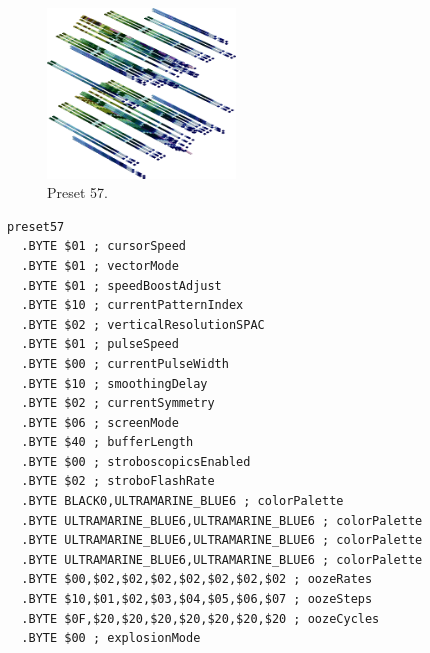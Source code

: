 \clearpage
\begin{minipage}[b]{0.48\linewidth}
\begin{figure}[H]                                                          
  \centering                                                             
  \begin{adjustbox}{width=5cm,center}                                   
  \includegraphics[width=5cm]{src/colorspace_presets/preset57-45.png}%
  \end{adjustbox}                                                        
\caption*{Preset 57.}                                           
\end{figure}                                                               
\end{minipage}
\hspace{0.1cm}
\begin{minipage}[b]{0.48\linewidth}                            
\begin{lstlisting}[basicstyle=\ttfamily\tiny]
preset57
  .BYTE $01 ; cursorSpeed
  .BYTE $01 ; vectorMode
  .BYTE $01 ; speedBoostAdjust
  .BYTE $10 ; currentPatternIndex
  .BYTE $02 ; verticalResolutionSPAC
  .BYTE $01 ; pulseSpeed
  .BYTE $00 ; currentPulseWidth
  .BYTE $10 ; smoothingDelay
  .BYTE $02 ; currentSymmetry
  .BYTE $06 ; screenMode
  .BYTE $40 ; bufferLength
  .BYTE $00 ; stroboscopicsEnabled
  .BYTE $02 ; stroboFlashRate
  .BYTE BLACK0,ULTRAMARINE_BLUE6 ; colorPalette
  .BYTE ULTRAMARINE_BLUE6,ULTRAMARINE_BLUE6 ; colorPalette
  .BYTE ULTRAMARINE_BLUE6,ULTRAMARINE_BLUE6 ; colorPalette
  .BYTE ULTRAMARINE_BLUE6,ULTRAMARINE_BLUE6 ; colorPalette
  .BYTE $00,$02,$02,$02,$02,$02,$02,$02 ; oozeRates
  .BYTE $10,$01,$02,$03,$04,$05,$06,$07 ; oozeSteps
  .BYTE $0F,$20,$20,$20,$20,$20,$20,$20 ; oozeCycles
  .BYTE $00 ; explosionMode
\end{lstlisting}
\end{minipage}

\vspace*{0.3cm}

